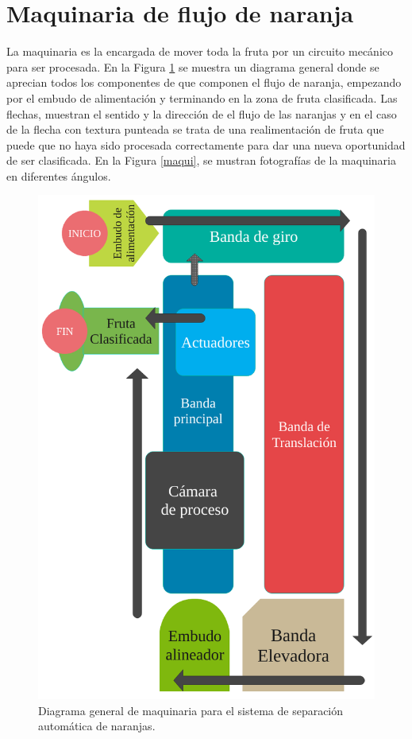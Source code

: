 \documentclass[twoside,spanish,ESP,MSc]{plantillaLabUPV}
\theoremstyle{definition}
\begin{document}
\section{Maquinaria de flujo de naranja}
La maquinaria es la encargada de mover toda la fruta por un circuito mecánico para ser procesada. En la Figura \ref{fig:diagramamaquina} se muestra un diagrama general donde se aprecian todos los componentes de que componen el flujo de naranja, empezando por el embudo de alimentación y terminando en la zona de fruta clasificada. Las flechas, muestran el sentido y la dirección de el flujo de las naranjas y en el caso de la flecha con textura punteada se trata de una realimentación de fruta que puede que no haya sido procesada correctamente para dar una nueva oportunidad de ser clasificada. En la Figura \ref{maqui}, se mustran fotografías de la maquinaria en diferentes ángulos.

\begin{figure}[!tbh]
	\centering
	\includegraphics[width=0.5\textheight]{edrawimas/diagramamaquina}
	\caption{Diagrama general de maquinaria para el sistema de separación automática de naranjas.}
	\label{fig:diagramamaquina}
\end{figure}
\end{document}
